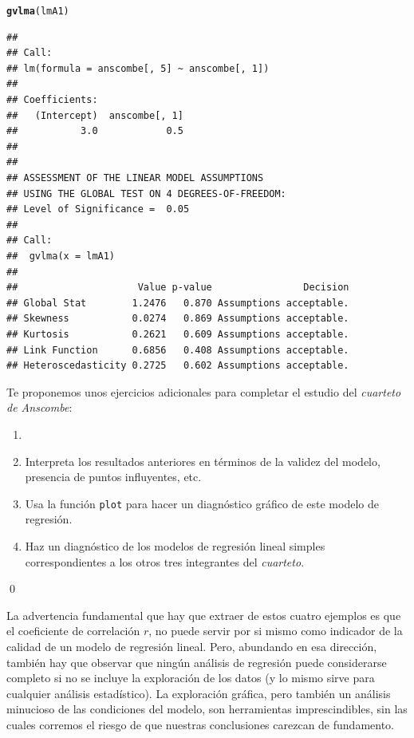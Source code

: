 \documentclass[10pt,a4paper]{article}\usepackage[]{graphicx}\usepackage[]{color}
\makeatletter
\newcommand{\hlstd}[1]{\textcolor[rgb]{0.345,0.345,0.345}{#1}}%
\newcommand{\hlkwd}[1]{\textcolor[rgb]{0.737,0.353,0.396}{\textbf{#1}}}%
\newenvironment{kframe}{%
 \def\at@end@of@kframe{}%
 \ifinner\ifhmode%
  \def\at@end@of@kframe{\end{minipage}}%
  \begin{minipage}{\columnwidth}%
 \fi\fi%
 \def\FrameCommand##1{\hskip\@totalleftmargin \hskip-\fboxsep
 \colorbox{shadecolor}{##1}\hskip-\fboxsep
     \hskip-\linewidth \hskip-\@totalleftmargin \hskip\columnwidth}%
 \MakeFramed {\advance\hsize-\width
   \@totalleftmargin\z@ \linewidth\hsize
   \@setminipage}}%
 {\par\unskip\endMakeFramed%
 \at@end@of@kframe}
\newenvironment{knitrout}{}{} %
\makeatother
\begin{document}
\begin{knitrout}
\begin{kframe}
\begin{alltt}
\hlkwd{gvlma}\hlstd{(lmA1)}
\end{alltt}
\begin{verbatim}
## 
## Call:
## lm(formula = anscombe[, 5] ~ anscombe[, 1])
## 
## Coefficients:
##   (Intercept)  anscombe[, 1]  
##           3.0            0.5  
## 
## 
## ASSESSMENT OF THE LINEAR MODEL ASSUMPTIONS
## USING THE GLOBAL TEST ON 4 DEGREES-OF-FREEDOM:
## Level of Significance =  0.05 
## 
## Call:
##  gvlma(x = lmA1) 
## 
##                     Value p-value                Decision
## Global Stat        1.2476   0.870 Assumptions acceptable.
## Skewness           0.0274   0.869 Assumptions acceptable.
## Kurtosis           0.2621   0.609 Assumptions acceptable.
## Link Function      0.6856   0.408 Assumptions acceptable.
## Heteroscedasticity 0.2725   0.602 Assumptions acceptable.
\end{verbatim}
\end{kframe}
\end{knitrout}
Te proponemos unos ejercicios adicionales para completar el estudio del {\em cuarteto de Anscombe}:
\begin{ejercicio}
\label{tut10:ejercicio08}
\begin{enumerate}
  \item[]
  \item Interpreta los resultados anteriores en términos de la validez del modelo, presencia de puntos influyentes, etc.
  \item Usa la función {\tt plot} para hacer un diagnóstico gráfico de este modelo de regresión.

  \item Haz un diagnóstico de los modelos de regresión lineal simples correspondientes a los otros tres integrantes del {\em cuarteto}.
\end{enumerate}
\qed
\end{ejercicio}

La advertencia fundamental que hay que extraer de estos cuatro ejemplos es que el coeficiente de correlación $r$, no puede servir por si mismo como indicador de la calidad de un modelo de regresión lineal. Pero, abundando en esa dirección, también hay que observar que ningún análisis de regresión puede considerarse completo si no se incluye la exploración de los datos (y lo mismo sirve para cualquier análisis estadístico). La exploración gráfica, pero también un análisis minucioso de las condiciones del modelo, son herramientas imprescindibles, sin las cuales corremos el riesgo de que nuestras conclusiones carezcan de fundamento.
\end{document}
